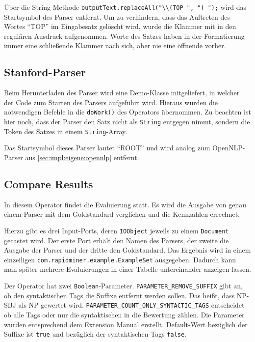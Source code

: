 Über die String Methode \texttt{outputText.replaceAll("\textbackslash \textbackslash (TOP ", "( ");} wird das Startsymbol des Parser entfernt. Um zu verhindern, dass das Auftreten des Wortes ``TOP'' im Eingabesatz gelöscht wird, wurde die Klammer mit in den regulären Ausdruck aufgenommen. Worte des Satzes haben in der Formatierung immer eine schließende Klammer nach sich, aber nie eine öffnende vorher.

\subsection{Stanford-Parser}

Beim Herunterladen des Parser wird eine Demo-Klasse mitgeliefert, in welcher der Code zum Starten des Parsers aufgeführt wird. Hieraus wurden die notwendigen Befehle in die \texttt{doWork()} des Operators übernommen. Zu beachten ist hier noch, dass der Parser den Satz nicht als \texttt{String} entgegen nimmt, sondern die Token des Satzes in einem \texttt{String}-Array.

Das Startsymbol dieses Parser lautet ``ROOT'' und wird analog zum OpenNLP-Parser aus \ref{sec:impl:eigene:opennlp} entfernt.

\subsection{Compare Results}

In diesem Operator findet die Evaluierung statt. Es wird die Ausgabe von genau einem Parser mit dem Goldstandard verglichen und die Kennzahlen errechnet.

Hierzu gibt es drei Input-Ports, deren \texttt{IOObject} jeweils zu einem \texttt{Document} gecastet wird. Der erste Port erhält den Namen des Parsers, der zweite die Ausgabe der Parser und der dritte den Goldstandard. Das Ergebnis wird in einem einzeiligen  \texttt{com.rapidminer.example.ExampleSet} ausgegeben. Dadurch kann man später mehrere Evaluierungen in einer Tabelle untereinander anzeigen lassen. 

Der Operator hat zwei \texttt{Boolean}-Parameter. \texttt{PARAMETER\_REMOVE\_SUFFIX} gibt an, ob den syntaktischen Tags die Suffixe entfernt werden sollen. Das heißt, dass NP-SBJ als NP gewertet wird. \texttt{PARAMETER\_COUNT\_ONLY\_SYNTACTIC\_TAGS} entscheidet ob alle Tags oder nur die syntaktischen in die Bewertung zählen. Die Parameter wurden entsprechend dem Extension Manual %
erstellt. Default-Wert bezüglich der Suffixe ist \texttt{true} und bezüglich der syntaktischen Tags \texttt{false}.


